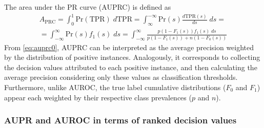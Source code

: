 The area under the PR curve (AUPRC) is defined as
%
\begin{multline}
    A_\text{PRC}
    = \int_{0}^{1} \text{Pr}(\text{TPR}) \;d\text{TPR}
    = \int_{\infty}^{-\infty} \text{Pr}(s) \frac{d\text{TPR}(s)}{ds} \;ds
    =\\
    = \int_{-\infty}^{\infty} \text{Pr}(s) f_1(s)\;ds
    = \int_{-\infty}^{\infty} \frac{p (1 - F_1(s)) f_1(s) \;ds}{p (1 - F_1(s)) + n (1 - F_0(s))}
    \label{eq:auprc0}
\end{multline}
%
From \autoref{eq:auprc0}, AUPRC can be interpreted as the average precision weighted by the distribution of positive instances. Analogously, it corresponds to collecting the decision values attributed to each positive instance, and then calculating the average precision considering only these values as classification thresholds.
Furthermore, unlike AUROC, the true label cumulative distributions ($F_0$ and $F_1$) appear each weighted by their respective class prevalences ($p$ and $n$).

%


\subsubsection{AUPR and AUROC in terms of ranked decision values}
\label{sec:metrics from ranks}

